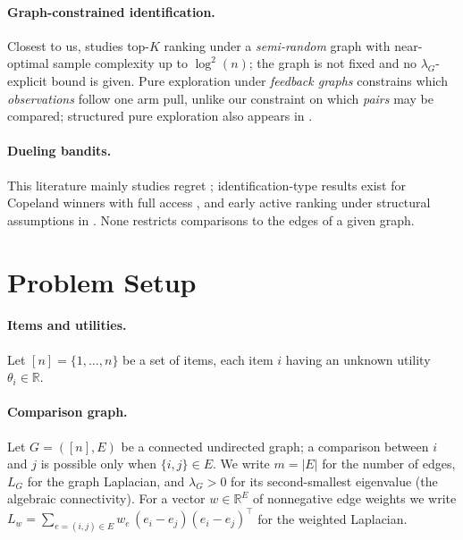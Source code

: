 \documentclass[11pt]{article}
\theoremstyle{definition}
\newcommand{\R}{\mathbb{R}}
\newcommand{\lG}{\lambda_G}
\begin{document}
\paragraph{Graph-constrained identification.}  Closest to us, \cite{yang2024topk} studies top-$K$ ranking under a \emph{semi-random} graph with near-optimal sample complexity up to $\log^2(n)$; the graph is not fixed and no $\lG$-explicit bound is given.  Pure exploration under \emph{feedback graphs} \cite{russo2025pure,cohen2016online} constrains which \emph{observations} follow one arm pull, unlike our constraint on which \emph{pairs} may be compared; structured pure exploration also appears in \cite{sentenac2021pure,antos2025semioverlapping}.

\paragraph{Dueling bandits.}  This literature mainly studies regret \cite{zoghi2013relative,agrawal2019klucb,wu2023borda,li2024feelgood,deb2026replicable,sharma2026lipschitz,yahmed2026on,saha2021dueling}; identification-type results exist for Copeland winners with full access \cite{bengs2023identifying}, and early active ranking under structural assumptions in \cite{jamieson2011active}.  None restricts comparisons to the edges of a given graph.

\section{Problem Setup}
\label{sec:setup}

\paragraph{Items and utilities.}  Let $[n]=\{1,\dots,n\}$ be a set of items, each item $i$ having an unknown utility $\theta_i\in\R$.

\paragraph{Comparison graph.}  Let $G=([n],E)$ be a connected undirected graph; a comparison between $i$ and $j$ is possible only when $\{i,j\}\in E$.  We write $m=|E|$ for the number of edges, $L_G$ for the graph Laplacian, and $\lG>0$ for its second-smallest eigenvalue (the algebraic connectivity).  For a vector $w\in\R^E$ of nonnegative edge weights we write $L_w=\sum_{e=(i,j)\in E} w_e\,(e_i-e_j)(e_i-e_j)^\top$ for the weighted Laplacian.
\end{document}
